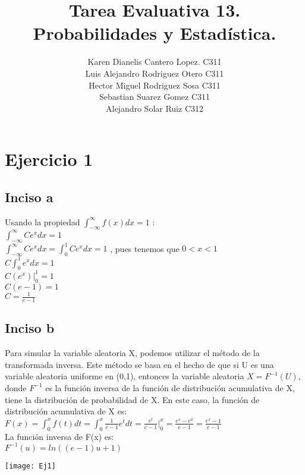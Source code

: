 \documentclass[15pt,a4paper]{article}
\title{Tarea Evaluativa 13.\\  Probabilidades y Estadística.}
\author{Karen Dianelis Cantero Lopez. C311 \\ Luis Alejandro Rodriguez Otero C311\\  Hector Miguel Rodriguez Sosa C311 \\ Sebastian Suarez Gomez C311 \\ Alejandro Solar Ruiz C312 }
\date{}
\begin{document}
\maketitle

\section{Ejercicio 1}
\subsection*{Inciso a}
Usando la propiedad  $ \int_{-\infty}^{\infty} f(x) dx = 1 $ : \\

$ \int_{-\infty}^{\infty}C e^{x} dx = 1 $ \\

$ \int_{-\infty}^{\infty}C e^{x} dx =  \int_{0}^{1}C e^{x} dx  = 1$ , pues tenemos que  $0<x<1$\\

 $C \int_{0}^{1} e^{x} dx  = 1$\\

$ C (e^{x}) \Big|_0^1 = 1$\\

$ C (e-1)  = 1$\\

$C = \frac{1}{e-1}$
\subsection*{Inciso b}
Para simular la variable aleatoria X, podemos utilizar el método de la transformada inversa. Este método se basa en el hecho de que si U es una variable aleatoria uniforme en (0,1), entonces la variable aleatoria $X = F^{-1}(U)$, donde $F^{-1}$ es la función inversa de la función de distribución acumulativa de X, tiene la distribución de probabilidad de X.
En este caso, la función de distribución acumulativa de X es: \\
 
   $F(x) = \int_{0}^{x} f(t)dt =  \int_{0}^{x} \frac{1}{ e - 1} e^t dt =  \frac{e^t}{e - 1}\Big|_0^x = \frac{e^x - e^0}{e - 1}=  \frac{e^x - 1}{ e - 1}$ \\
   
La función inversa de F(x) es: \\
  
  $ F^{-1}(u) = ln((e - 1)u + 1)$

\begin{center}
\texttt{[image: Ej1]}
\end{center}
\end{document}
